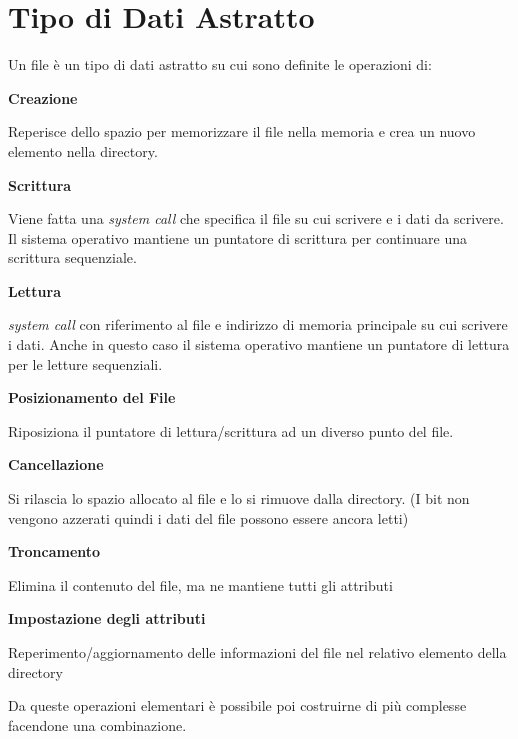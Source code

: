 \section{Tipo di Dati Astratto}
Un file è un tipo di dati astratto su cui sono definite le operazioni di:
\begin{sitemize}
    \item \textbf{Creazione}

    Reperisce dello spazio per memorizzare il file nella memoria e crea un nuovo elemento nella directory.

    \item \textbf{Scrittura}

    Viene fatta una \textit{system call} che specifica il file su cui scrivere e i dati da scrivere.
    Il sistema operativo mantiene un puntatore di scrittura per continuare una scrittura sequenziale.

    \item \textbf{Lettura}

    \textit{system call} con riferimento al file e indirizzo di memoria principale su cui scrivere i dati. Anche in questo caso il sistema operativo mantiene un puntatore di lettura per le letture sequenziali.

    \item \textbf{Posizionamento del File}

    Riposiziona il puntatore di lettura/scrittura ad un diverso punto del file.

    \item \textbf{Cancellazione}

    Si rilascia lo spazio allocato al file e lo si rimuove dalla directory. (I bit non vengono azzerati quindi i dati del file possono essere ancora letti)

    \item \textbf{Troncamento}

    Elimina il contenuto del file, ma ne mantiene tutti gli attributi

    \item \textbf{Impostazione degli attributi}

    Reperimento/aggiornamento delle informazioni del file nel relativo elemento della directory
\end{sitemize}

Da queste operazioni elementari è possibile poi costruirne di più complesse facendone una combinazione.

